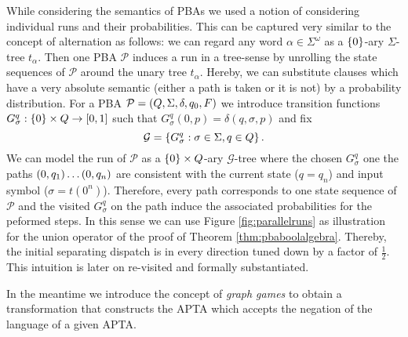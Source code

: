 While considering the semantics of \acp{PBA} we used a notion of considering 
individual runs and their probabilities. This can be captured very similar to 
the concept of alternation as follows: we can regard any word 
$\alpha\in\Sigma^{\omega}$ as a $\left\{0\right\}$-ary $\Sigma$-tree $t_{\alpha}$. Then 
one \ac{PBA} $\mathcal{P}$ induces a run in a tree-sense by unrolling the state
sequences of $\mathcal{P}$ around the unary tree $t_{\alpha}$. Hereby, we can
substitute clauses which have a very absolute semantic (either a
path is taken or it is not) by a probability distribution.
For a \ac{PBA} $\mathcal{P} = \left(Q, \Sigma, \delta, q_{0}, F\right)$ we introduce
transition functions $G_{\sigma}^{q}:\left\{0\right\}\times Q\rightarrow\left[0,1\right]$
such that $G_{\sigma}^{q}(0, p) = \delta(q,\sigma, p)$ and fix
\begin{equation*}
  \mathcal{G} = \left\{G_{\sigma}^{q}:\sigma\in\Sigma,q\in Q\right\}.
\end{equation*}
We can model the run of $\mathcal{P}$ as a $\left\{0\right\}\times Q$-ary
$\mathcal{G}$-tree where the chosen $G_{\sigma}^{q}$ one the paths
$\left(0,q_{1}\right)\dots\left(0,q_{n}\right)$ are consistent with the current state
($q = q_{n}$) and input symbol ($\sigma = t(0^n)$). Therefore, every path
corresponds to one state sequence of $\mathcal{P}$ and the visited
$G_{\sigma}^{q}$ on the path induce the associated probabilities for the
peformed steps. In this sense we can use Figure \ref{fig:parallelruns} as
illustration for the union operator of the proof of Theorem
\ref{thm:pbaboolalgebra}. Thereby, the initial separating dispatch is in every
direction tuned down by a factor of $\frac{1}{2}$. This intuition is later on
re-visited and formally substantiated.

In the meantime we introduce the concept of \emph{graph games} 
to obtain a transformation that constructs the \ac{APTA} which accepts the 
negation of the language of a given \ac{APTA}.

